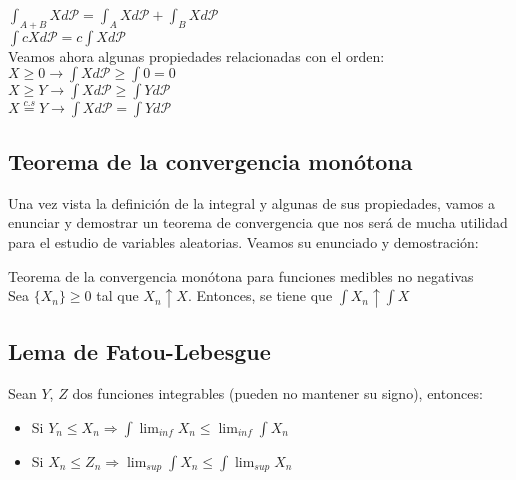 \documentclass[12pt,a4paper]{book}
\begin{document}
$\displaystyle \int_{A+B} X d\mathcal{P} = \int_A X d\mathcal{P} + \int_B X d \mathcal{P}$\\

$\displaystyle \int cXd\mathcal{P} = c\int Xd\mathcal{P}$\\

Veamos ahora algunas propiedades relacionadas con el orden:\\

$X \geq 0 \rightarrow \displaystyle \int X d\mathcal{P} \geq \int 0 = 0$\\

$X \geq Y \rightarrow \displaystyle \int X d\mathcal{P} \geq \int Y d\mathcal{P}$\\

$\displaystyle X \stackrel{c.s}{=} Y \rightarrow \int X d\mathcal{P} = \int Y d\mathcal{P}$\\

\subsection{Teorema de la convergencia monótona}
Una vez vista la definición de la integral y algunas de sus propiedades, vamos a enunciar y demostrar un teorema de convergencia que nos será de mucha utilidad para el estudio de variables aleatorias. Veamos su enunciado y demostración:\\

\begin{theorem}
Teorema de la convergencia monótona para funciones medibles no negativas\\

Sea $\{X_n\} \geq 0$ tal que $X_n \uparrow X$. Entonces, se tiene que $\displaystyle \int X_n \uparrow \int X$
\end{theorem}

\subsection{Lema de Fatou-Lebesgue}
\begin{lemma}
Sean $Y$, $Z$ dos funciones integrables (pueden no mantener su signo), entonces:
\begin{itemize}
\item Si $Y_n\leq X_n\Longrightarrow \displaystyle\int\displaystyle\lim_{inf}X_n\leq\displaystyle\lim_{inf}\displaystyle\int X_n$
\item Si $X_n\leq Z_n\Longrightarrow \displaystyle\lim_{sup}\displaystyle\int X_n\leq \displaystyle\int\displaystyle\lim_{sup} X_n$
\end{itemize}
\end{lemma}
    
\end{document}
